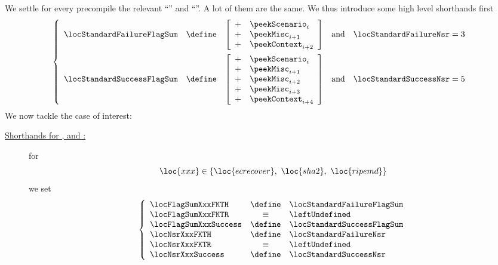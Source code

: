 We settle for every precompile the relevant ``'' and ``''. 
A lot of them are the same. We thus introduce some high level shorthands first
\[
	\left\{ \begin{array}{lclcr}
		\locStandardFailureFlagSum & \define & 
		\left[ \begin{array}{cl}
			+ & \peekScenario  _{i    } \\ 
			+ & \peekMisc      _{i + 1} \\ 
			+ & \peekContext   _{i + 2} \\ 
		\end{array} \right] & \text{and} & \locStandardFailureNsr = 3
		\vspace{2mm} \\
		\locStandardSuccessFlagSum & \define & 
		\left[ \begin{array}{cl}
			+ & \peekScenario  _{i    } \\ 
			+ & \peekMisc      _{i + 1} \\ 
			+ & \peekMisc      _{i + 2} \\ 
			+ & \peekMisc      _{i + 3} \\ 
			+ & \peekContext   _{i + 4} \\ 
		\end{array} \right] & \text{and} & \locStandardSuccessNsr = 5 \\
	\end{array} \right.
\]
We now tackle the case of interest: 
\begin{description}
	\item[\underline{\underline{Shorthands for ,  and :}}]
		for
		\[
			\loc{xxx} \in \left\{ \loc{ecrecover}, ~ \loc{sha2}, ~ \loc{ripemd} \right\}
		\]
		we set
		\[
			\left\{ \begin{array}{lcl}
				\locFlagSumXxxFKTH    & \define & \locStandardFailureFlagSum \\
				\locFlagSumXxxFKTR    & \equiv  & \leftUndefined             \\
				\locFlagSumXxxSuccess & \define & \locStandardSuccessFlagSum \\
				\locNsrXxxFKTH        & \define & \locStandardFailureNsr     \\
				\locNsrXxxFKTR        & \equiv  & \leftUndefined             \\
				\locNsrXxxSuccess     & \define & \locStandardSuccessNsr     \\
			\end{array} \right.
		\]
\end{description}
